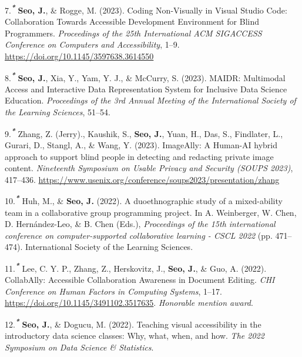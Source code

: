\documentclass[11pt,a4paper,]{awesome-cv}
\newlength{\cslhangindent}
\newenvironment{CSLReferences}[2] %
 {\begin{list}{}{%
  \setlength{\itemindent}{0pt}
  \setlength{\leftmargin}{0pt}
  \setlength{\parsep}{0pt}
  \ifodd #1
   \setlength{\leftmargin}{\cslhangindent}
   \setlength{\itemindent}{-1\cslhangindent}
  \fi
  \setlength{\itemsep}{#2\baselineskip}}}
 {\end{list}}
\begin{document}
\begin{CSLReferences}{1}{0}
7.\textsuperscript{\textbf{\emph{*}}} \textbf{Seo, J.}, \& Rogge, M.
(2023). Coding Non-Visually in Visual Studio Code: Collaboration Towards
Accessible Development Environment for Blind Programmers.
\emph{Proceedings of the 25th International ACM SIGACCESS Conference on
Computers and Accessibility}, 1--9.
\url{https://doi.org/10.1145/3597638.3614550}

8.\textsuperscript{\textbf{\emph{*}}} \textbf{Seo, J.}, Xia, Y., Yam, Y.
J., \& McCurry, S. (2023). MAIDR: Multimodal Access and Interactive Data
Representation System for Inclusive Data Science Education.
\emph{Proceedings of the 3rd Annual Meeting of the International Society
of the Learning Sciences}, 51--54.

9.\textsuperscript{\textbf{\emph{*}}} Zhang, Z. (Jerry)., Kaushik, S.,
\textbf{Seo, J.}, Yuan, H., Das, S., Findlater, L., Gurari, D., Stangl,
A., \& Wang, Y. (2023). ImageAlly: A Human-AI hybrid approach to support
blind people in detecting and redacting private image content.
\emph{Nineteenth Symposium on Usable Privacy and Security (SOUPS 2023)},
417--436.
\url{https://www.usenix.org/conference/soups2023/presentation/zhang}

10.\textsuperscript{\textbf{\emph{*}}} Huh, M., \& \textbf{Seo, J.}
(2022). A duoethnographic study of a mixed-ability team in a
collaborative group programming project. In A. Weinberger, W. Chen, D.
Hernández-Leo, \& B. Chen (Eds.), \emph{Proceedings of the 15th
international conference on computer-supported collaborative learning -
CSCL 2022} (pp. 471--474). International Society of the Learning
Sciences.

11.\textsuperscript{\textbf{\emph{*}}} Lee, C. Y. P., Zhang, Z.,
Herskovitz, J., \textbf{Seo, J.}, \& Guo, A. (2022). CollabAlly:
Accessible Collaboration Awareness in Document Editing. \emph{CHI
Conference on Human Factors in Computing Systems}, 1--17.
\url{https://doi.org/10.1145/3491102.3517635}. \emph{Honorable mention
award}.

12.\textsuperscript{\textbf{\emph{*}}} \textbf{Seo, J.}, \& Dogucu, M.
(2022). Teaching visual accessibility in the introductory data science
classes: Why, what, when, and how. \emph{The 2022 Symposium on Data
Science \& Statistics}.


\end{CSLReferences}
\end{document}
